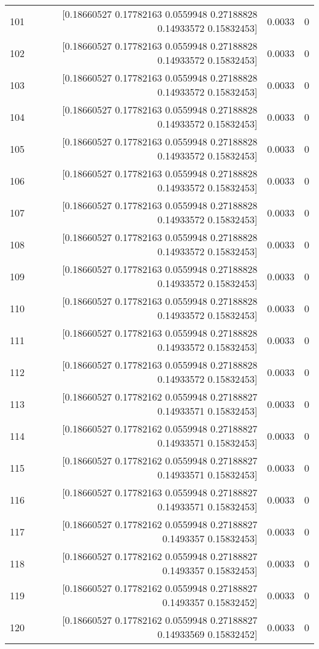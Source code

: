\begin{longtable}{lrrr}
101 & [0.18660527 0.17782163 0.0559948  0.27188828 0.14933572 0.15832453] & 0.0033 & 0 \\
102 & [0.18660527 0.17782163 0.0559948  0.27188828 0.14933572 0.15832453] & 0.0033 & 0 \\
103 & [0.18660527 0.17782163 0.0559948  0.27188828 0.14933572 0.15832453] & 0.0033 & 0 \\
104 & [0.18660527 0.17782163 0.0559948  0.27188828 0.14933572 0.15832453] & 0.0033 & 0 \\
105 & [0.18660527 0.17782163 0.0559948  0.27188828 0.14933572 0.15832453] & 0.0033 & 0 \\
106 & [0.18660527 0.17782163 0.0559948  0.27188828 0.14933572 0.15832453] & 0.0033 & 0 \\
107 & [0.18660527 0.17782163 0.0559948  0.27188828 0.14933572 0.15832453] & 0.0033 & 0 \\
108 & [0.18660527 0.17782163 0.0559948  0.27188828 0.14933572 0.15832453] & 0.0033 & 0 \\
109 & [0.18660527 0.17782163 0.0559948  0.27188828 0.14933572 0.15832453] & 0.0033 & 0 \\
110 & [0.18660527 0.17782163 0.0559948  0.27188828 0.14933572 0.15832453] & 0.0033 & 0 \\
111 & [0.18660527 0.17782163 0.0559948  0.27188828 0.14933572 0.15832453] & 0.0033 & 0 \\
112 & [0.18660527 0.17782163 0.0559948  0.27188828 0.14933572 0.15832453] & 0.0033 & 0 \\
113 & [0.18660527 0.17782162 0.0559948  0.27188827 0.14933571 0.15832453] & 0.0033 & 0 \\
114 & [0.18660527 0.17782162 0.0559948  0.27188827 0.14933571 0.15832453] & 0.0033 & 0 \\
115 & [0.18660527 0.17782162 0.0559948  0.27188827 0.14933571 0.15832453] & 0.0033 & 0 \\
116 & [0.18660527 0.17782163 0.0559948  0.27188827 0.14933571 0.15832453] & 0.0033 & 0 \\
117 & [0.18660527 0.17782162 0.0559948  0.27188827 0.1493357  0.15832453] & 0.0033 & 0 \\
118 & [0.18660527 0.17782162 0.0559948  0.27188827 0.1493357  0.15832453] & 0.0033 & 0 \\
119 & [0.18660527 0.17782162 0.0559948  0.27188827 0.1493357  0.15832452] & 0.0033 & 0 \\
120 & [0.18660527 0.17782162 0.0559948  0.27188827 0.14933569 0.15832452] & 0.0033 & 0 \\

\end{longtable}
